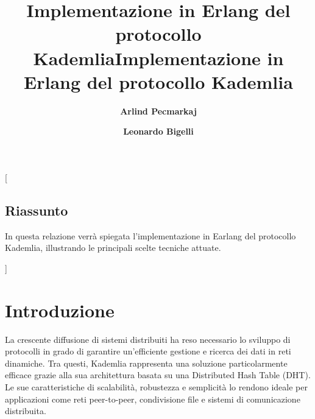 \documentclass{article}
\title{\color{FireBrick}\bf{Implementazione in Erlang del protocollo Kademlia}}
\author[1]{\color{FireBrick}\bf{Arlind Pecmarkaj}}
\author[2]{\color{FireBrick}\bf{Leonardo Bigelli}}
\affil[1]{a.pecmarkaj@campus.uniurb.it}
\affil[2]{l.bigelli2@campus.uniurb.it}
\date{}
\begin{document}
{
}
\thispagestyle{firstpage}

\pagestyle{fancy}

\fancyhead{} %
\fancyhead[L]{\color{Black}{\footnotesize{\thetitle}}}
\fancyfoot{} %
\fancyfoot[R]{\footnotesize{\bf{\thepage}}}



\twocolumn
[{
\maketitle
\thispagestyle{firstpage}
\title{\color{Black}\bf{Implementazione in Erlang del protocollo Kademlia}}
\normalsize
\begin{tcolorbox}[  colback = WhiteSmoke,
                    ,
                    width=\linewidth,
                    arc=1mm, auto outer arc,
                ]
\section*{Riassunto}
In questa relazione verrà spiegata l'implementazione in Earlang del protocollo Kademlia, illustrando le principali scelte tecniche attuate.
\end{tcolorbox}
\vspace{1.5ex}
}]



\section{Introduzione}
La crescente diffusione di sistemi distribuiti ha reso necessario lo sviluppo di protocolli in grado di garantire un'efficiente gestione e ricerca dei dati in reti dinamiche. Tra questi, Kademlia rappresenta una soluzione particolarmente efficace grazie alla sua architettura basata su una Distributed Hash Table (DHT). Le sue caratteristiche di scalabilità, robustezza e semplicità lo rendono ideale per applicazioni come reti peer-to-peer, condivisione file e sistemi di comunicazione distribuita.
\end{document}
